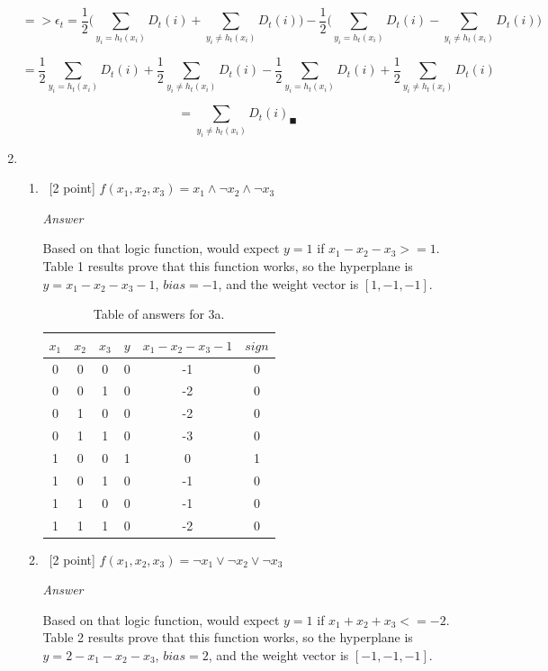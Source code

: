 \documentclass[12pt, fullpage,letterpaper]{article}
\begin{document}
\begin{enumerate}
\[
    => \epsilon_t = \frac{1}{2}\big(\sum_{y_i = h_t(x_i)} D_t(i) + \sum_{y_i \neq h_t(x_i)} D_t(i)\big) - \frac{1}{2}\big(\sum_{y_i = h_t(x_i)} D_t(i) - \sum_{y_i \neq h_t(x_i)} D_t(i)\big)
\]

\[
    = \frac{1}{2}\sum_{y_i = h_t(x_i)} D_t(i) + \frac{1}{2}\sum_{y_i \neq h_t(x_i)} D_t(i) - \frac{1}{2}\sum_{y_i = h_t(x_i)} D_t(i) + \frac{1}{2}\sum_{y_i \neq h_t(x_i)} D_t(i)
\]

\[
    = \sum_{y_i \neq h_t(x_i)} D_t(i)_\blacksquare
\]

\item~
	\begin{enumerate}
		\item~[2 point] $f(x_1, x_2, x_3) = x_1 \land \neg x_2 \land \neg x_3$
		
		\emph{Answer}
		
		Based on that logic function, would expect $y=1$ if $x_1-x_2-x_3>=1$. Table 1 results prove that this function works, so the hyperplane is $y=x_1-x_2-x_3-1$, $bias=-1$, and the weight vector is $[1, -1, -1]$.
		
		\begin{table}
        	\centering
        	\begin{tabular}{ccccc|c}
        		$x_1 $ & $x_2$ & $x_3$ & $y$ & $x_1-x_2-x_3-1$ & $sign$\\ 
        		\hline\hline
        		0 & 0 & 0 & 0 & -1 & 0 \\ \hline
        		0 & 0 & 1 & 0 & -2 & 0 \\ \hline
        		0 & 1 & 0 & 0 & -2 & 0 \\ \hline
        		0 & 1 & 1 & 0 & -3 & 0 \\ \hline
        		1 & 0 & 0 & 1 &  0 & 1 \\ \hline
        		1 & 0 & 1 & 0 & -1 & 0 \\ \hline
        		1 & 1 & 0 & 0 & -1 & 0 \\ \hline
        		1 & 1 & 1 & 0 & -2 & 0 \\ \hline
        	\end{tabular}
        	\caption{Table of answers for 3a.}\label{tb:1}
        \end{table}
		
		\item~[2 point] $f(x_1, x_2, x_3) = \neg x_1 \lor \neg x_2 \lor \neg x_3$ 
		
		\emph{Answer}
		
		Based on that logic function, would expect $y=1$ if $x_1+x_2+x_3<=-2$. Table 2 results prove that this function works, so the hyperplane is $y=2-x_1-x_2-x_3$, $bias=2$, and the weight vector is $[-1, -1, -1]$.
		

\end{enumerate}
\end{enumerate}
\end{document}
